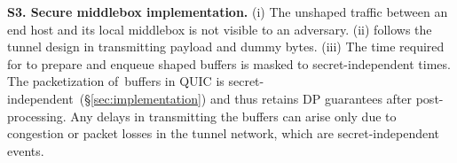 {\bf S3. Secure middlebox implementation.}
{(i)} The unshaped traffic between an end host and its local middlebox is
not visible to an adversary.
(ii) {\dshaper} follows the tunnel design in transmitting payload and dummy
bytes.
%
%
(iii) The time required for {\prepare} to prepare and enqueue shaped
buffers is masked to secret-independent times. The packetization of~buffers in
QUIC is secret-independent~(\S\ref{sec:implementation}) and
thus retains DP guarantees after post-processing.
Any delays in transmitting the buffers can arise only due to congestion or
packet losses in the tunnel network, which are secret-independent events.
%
%



